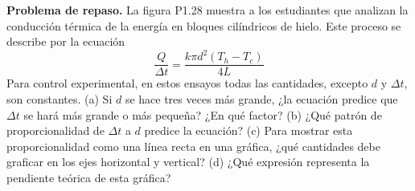 \item \textbf{Problema de repaso.} La figura P1.28 muestra a los estudiantes que analizan la conducción térmica de la energía en bloques cilíndricos de hielo. Este proceso se describe por la ecuación
$$ \frac{Q}{\Delta t} = \frac{k \pi d^2 (T_h - T_c)}{4L} $$
Para control experimental, en estos ensayos todas las cantidades, excepto $d$ y $\Delta t$, son constantes. (a) Si $d$ se hace tres veces más grande, ¿la ecuación predice que $\Delta t$ se hará más grande o más pequeña? ¿En qué factor? (b) ¿Qué patrón de proporcionalidad de $\Delta t$ a $d$ predice la ecuación? (c) Para mostrar esta proporcionalidad como una línea recta en una gráfica, ¿qué cantidades debe graficar en los ejes horizontal y vertical? (d) ¿Qué expresión representa la pendiente teórica de esta gráfica?
